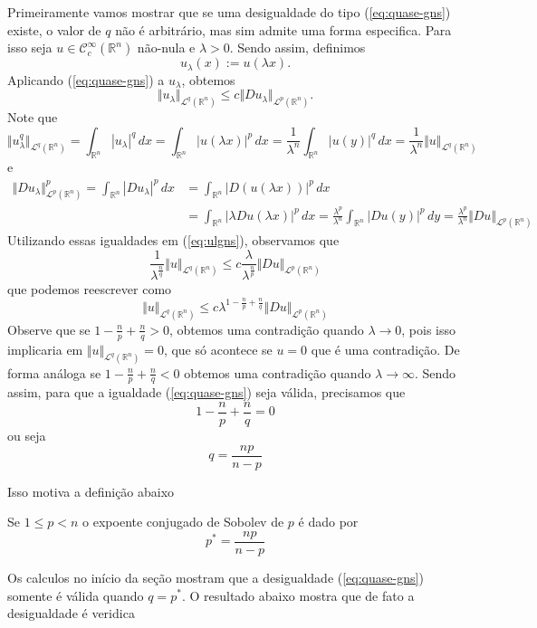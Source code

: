 \documentclass[a4paper, 11pt]{book}
\theoremstyle{definition}
\newcommand{\bR}{\mathbb{R}}
\newcommand{\cC}{\mathcal{C}}
\newcommand{\cL}{\mathcal{L}}
\begin{document}
Primeiramente vamos mostrar que se uma desigualdade do tipo (\ref{eq:quase-gns}) existe, o valor de $q$ não é arbitrário, mas sim admite uma forma especifica.
Para isso seja $u \in \cC^\infty_c(\bR^n)$ não-nula e $\lambda > 0$.
Sendo assim, definimos
\[
    u_\lambda(x) := u(\lambda x).
\]
Aplicando (\ref{eq:quase-gns}) a $u_\lambda$, obtemos
\begin{equation} \label{eq:ulgns}
    \Vert u_\lambda \Vert_{\cL^q(\bR^n)} \leqslant c \Vert Du_\lambda \Vert_{\cL^p(\bR^n)}.
\end{equation}
Note que
\[
    \Vert u_\lambda^q \Vert_{\cL^q(\bR^n)} = \int_{\bR^n} |u_\lambda|^q \,dx = \int_{\bR^n} |u(\lambda x)|^p \,dx = \frac{1}{\lambda^n} \int_{\bR^n} |u(y)|^q \,dx = \frac{1}{\lambda^n}\Vert u \Vert_{\cL^q(\bR^n)}
\]
e
\[
    \begin{aligned}
        \Vert Du_\lambda \Vert_{\cL^p(\bR^n)}^p = \int_{\bR^n} |Du_\lambda|^p \,dx &= \int_{\bR^n} |D(u(\lambda x))|^p \,dx \\
        &= \int_{\bR^n} |\lambda Du(\lambda x)|^p \,dx = \frac{\lambda^p}{\lambda^n} \int_{\bR^n} |Du(y)|^p \,dy = \frac{\lambda^p}{\lambda^n}\Vert Du \Vert_{\cL^p(\bR^n)}
    \end{aligned}
\]
Utilizando essas igualdades em (\ref{eq:ulgns}), observamos que
\[
    \frac{1}{\lambda^{\frac{n}{q}}} \Vert u \Vert_{\cL^q(\bR^n)} \leqslant c \frac{\lambda}{\lambda^{\frac{n}{p}}}\Vert Du \Vert_{\cL^p(\bR^n)}
\]
que podemos reescrever como
\begin{equation}
    \Vert u \Vert_{\cL^q(\bR^n)} \leqslant c\lambda^{1 - \frac{n}{p}  + \frac{n}{q}}\Vert Du \Vert_{\cL^p(\bR^n)}
\end{equation}
Observe que se $1 - \frac{n}{p} + \frac{n}{q} > 0$, obtemos uma contradição quando $\lambda \to 0$, pois isso implicaria em $\Vert u \Vert_{\cL^q(\bR^n)} = 0$,
que só acontece se $u = 0$ que é uma contradição.
De forma análoga se $1 - \frac{n}{p} + \frac{n}{q} < 0$ obtemos uma contradição quando $\lambda \to \infty$.
Sendo assim, para que a igualdade (\ref{eq:quase-gns}) seja válida, precisamos que
\[
    1 - \frac{n}{p} + \frac{n}{q} = 0
\]
ou seja
\[
    q = \frac{np}{n - p}
\]

Isso motiva a definição abaixo
\begin{dbox}
    Se $1 \leqslant p < n$ o expoente conjugado de Sobolev de $p$ é dado por
    \[
        p^* = \frac{np}{n - p}
    \]
\end{dbox}

Os calculos no início da seção mostram que a desigualdade (\ref{eq:quase-gns}) somente é válida quando $q = p^*$. O resultado abaixo mostra que de fato a desigualdade é veridica
\end{document}
